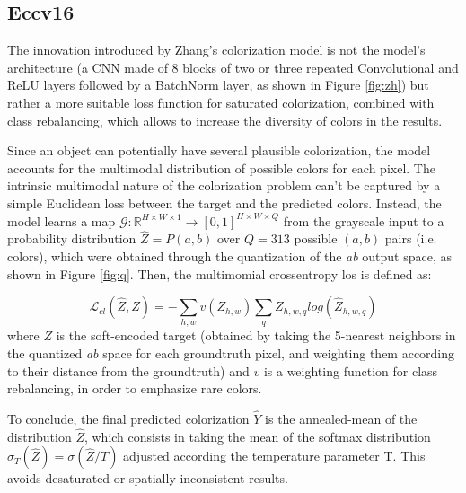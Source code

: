 \subsection{Eccv16}
The innovation introduced by Zhang's colorization model is not the model's architecture (a CNN made of 8 blocks of
two or three repeated Convolutional and ReLU layers followed by a BatchNorm layer, as shown in Figure \ref{fig:zh}) but rather a more suitable loss function for saturated colorization, combined with class rebalancing, which allows to increase the diversity of colors in the results.

Since an object can potentially have several plausible colorization, the model accounts for the multimodal
distribution of possible colors for each pixel. The intrinsic multimodal nature of the colorization
problem can't be captured by a simple Euclidean loss between the target and the predicted colors. Instead, the
model learns a map $\mathcal{G}: \mathbb{R}^{H\times W\times1}\rightarrow [0,1]^{H\times W\times Q}$ from the grayscale input to a probability
distribution $\hat{Z}=P(a,b)$ over $Q=313$ possible $(a,b)$ pairs (i.e. colors), which were obtained through the
quantization of the \textit{ab} output space, as shown in Figure \ref{fig:q}. Then, the multimomial crossentropy
los is defined as:

\begin{equation*}
	\mathcal{L}_{cl} (\hat{Z},Z)= - \sum_{h,w} v(Z_{h,w})\sum_q Z_{h,w,q}log(\hat{Z}_{h,w,q})
\end{equation*}
where $Z$ is the soft-encoded target (obtained by taking the 5-nearest neighbors in the quantized \textit{ab} space
for each groundtruth pixel, and weighting them according to their distance from the groundtruth) and $v$ is a
weighting function for class rebalancing, in order to emphasize rare colors.

To conclude, the final predicted colorization $\hat{Y}$ is the annealed-mean of the distribution $\hat{Z}$, which
consists in taking the mean of the softmax distribution $\sigma_T(\hat{Z}) = \sigma(\hat{Z}/T)$ adjusted according the
temperature parameter T. This avoids desaturated or spatially inconsistent results.